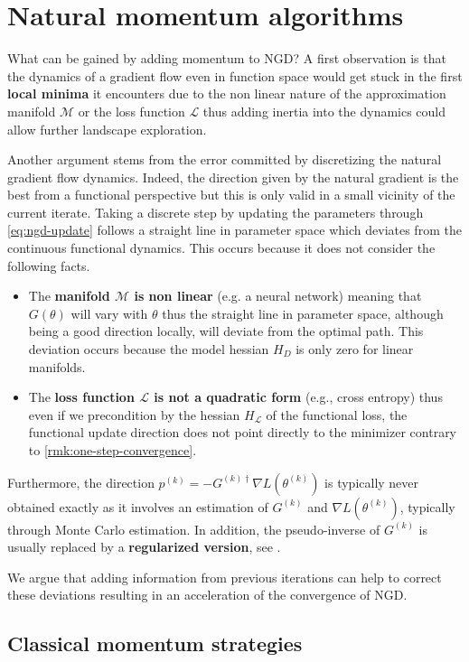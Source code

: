\documentclass{article}
\theoremstyle{noparens}
\newcommand{\cL}{\mathcal{L}}
\newcommand{\cM}{\mathcal{M}}
\newcommand{\paramk}{\theta^{(k)}}
\newcommand{\Ginvk}{{G^{(k)\dagger}}}
\newcommand{\GradP}{\nabla}
\newcommand{\LossGrad}{\GradP L}
\begin{document}
\section{Natural momentum algorithms}
\label{sec:natural-momentum}

What can be gained by adding momentum to NGD? A first observation is that the dynamics of a gradient flow even in function space would get stuck in the first \textbf{local minima} it encounters due to the non linear nature of the approximation manifold $\cM$ or the loss function $\cL$ thus adding inertia into the dynamics could allow further landscape exploration.

Another argument stems from the error committed by discretizing the natural gradient flow dynamics. Indeed, the direction given by the natural gradient is the best from a functional perspective but this is only valid in a small vicinity of the current iterate. Taking a discrete step by updating the parameters through \eqref{eq:ngd-update} follows a straight line in parameter space which deviates from the continuous functional dynamics. This occurs because it does not consider the following facts.
\begin{itemize}
    \item The \textbf{manifold $\cM$ is non linear} (e.g. a neural network) meaning that $G(\theta)$ will vary with $\theta$ thus the straight line in parameter space, although being a good direction locally, will deviate from the optimal path. This deviation occurs because the model hessian $H_D$ is only zero for linear manifolds.
    \item  The \textbf{loss function $\cL$ is not a quadratic form} (e.g., cross entropy) thus even if we precondition  by the hessian $H_\cL$  of the functional loss, the functional update direction does not point directly to the minimizer contrary to \cref{rmk:one-step-convergence}.
\end{itemize}

Furthermore, the direction $p^{(k)}=-\Ginvk\nabla L(\paramk)$ is typically never obtained exactly as it involves an estimation of $G^{(k)}$ and $\LossGrad(\paramk)$, typically through Monte Carlo estimation. In addition,  the pseudo-inverse of $G^{(k)}$ is usually replaced  by  a \textbf{regularized version}, see .

We argue that adding information from previous iterations can help to correct these deviations resulting in an acceleration of the convergence of NGD.


\subsection{Classical momentum strategies}
\label{sec:classical-momentum}
\end{document}

